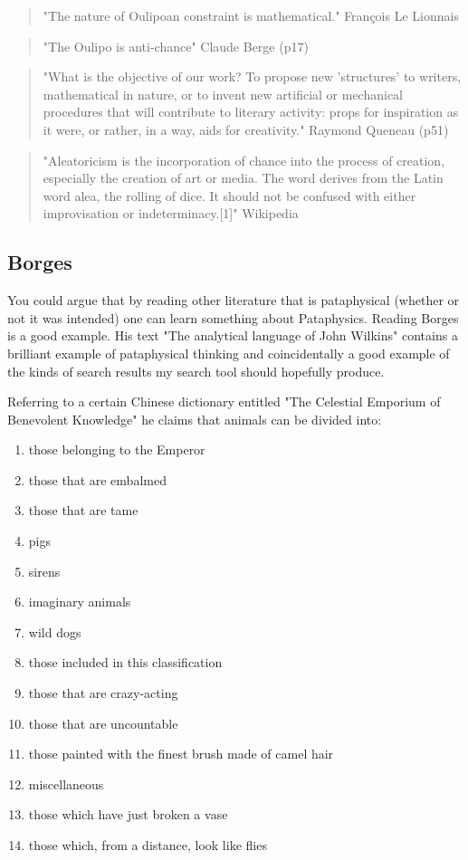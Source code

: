 \begin{quote}
  "The nature of Oulipoan constraint is mathematical." François Le Lionnais
\end{quote}

\begin{quote}
  "The Oulipo is anti-chance" Claude Berge (p17)
\end{quote}

\begin{quote}
  "What is the objective of our work? To propose new 'structures' to writers, mathematical in nature, or to invent new artificial or mechanical procedures that will contribute to literary activity: props for inspiration as it were, or rather, in a way, aids for creativity." Raymond Queneau (p51)
\end{quote}

\begin{quote}
  "Aleatoricism is the incorporation of chance into the process of creation, especially the creation of art or media. The word derives from the Latin word alea, the rolling of dice. It should not be confused with either improvisation or indeterminacy.[1]" Wikipedia
\end{quote}

\subsection{Borges}

You could argue that by reading other literature that is pataphysical (whether or not it was intended) one can learn something about Pataphysics. Reading Borges \citep{Borges1964, Borges2004, Borges1957, Borges2010a, Borges2010b, Borges2000} is a good example. His text "The analytical language of John Wilkins" \citep{Borges2000} contains a brilliant example of pataphysical thinking and coincidentally a good example of the kinds of search results my search tool should hopefully produce.

Referring to a certain Chinese dictionary entitled "The Celestial Emporium of Benevolent Knowledge" he claims that animals can be divided into:

\begin{enumerate}
  \item	those belonging to the Emperor
  \item	those that are embalmed
  \item	those that are tame
  \item	pigs
  \item	sirens
  \item	imaginary animals
  \item	wild dogs
  \item	those included in this classification
  \item	those that are crazy-acting
  \item	those that are uncountable
  \item	those painted with the finest brush made of camel hair
  \item	miscellaneous
  \item	those which have just broken a vase
  \item	those which, from a distance, look like flies
\end{enumerate}

